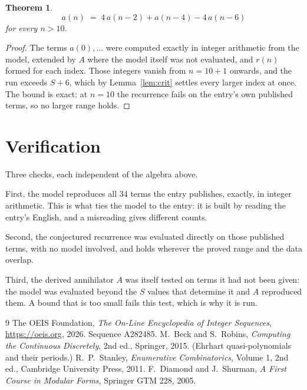 \documentclass[11pt,a4paper]{article}
\theoremstyle{plain}
\newtheorem{theorem}{Theorem}
\theoremstyle{definition}
\begin{document}
\begin{theorem}
\[
a(n)\;=\;4\,a(n-2) + a(n-4) - 4\,a(n-6)
\]
for every $n>10$.
\end{theorem}

\begin{proof}
The terms $a(0),\dots$ were computed exactly in integer arithmetic from the model, extended by
$A$ where the model itself was not evaluated, and $r(n)$ formed for each index. Those integers
vanish from $n=10+1$ onwards, and the run exceeds $S+6$, which by
Lemma~\ref{lem:crit} settles every larger index at once. The bound is exact: at $n=10$ the recurrence fails on the entry's own published terms, so no larger range holds.
\end{proof}

\section{Verification}

Three checks, each independent of the algebra above.

First, the model reproduces all $34$ terms the entry publishes, exactly, in integer
arithmetic. This is what ties the model to the entry: it is built by reading the entry's
English, and a misreading gives different counts.

Second, the conjectured recurrence was evaluated directly on those published terms, with no
model involved, and holds wherever the proved range and the data overlap.

Third, the derived annihilator $A$ was itself tested on terms it had not been given: the model
was evaluated beyond the $S$ values that determine it and $A$ reproduced them. A bound that is
too small fails this test, which is why it is run.

\begin{thebibliography}{9}
 The OEIS Foundation, \emph{The On-Line Encyclopedia of Integer
Sequences}, \url{https://oeis.org}, 2026. Sequence A282485.
 M.~Beck and S.~Robins, \emph{Computing the Continuous Discretely},
2nd ed., Springer, 2015. (Ehrhart quasi-polynomials and their periods.)
 R.~P.~Stanley, \emph{Enumerative Combinatorics}, Volume 1, 2nd ed.,
Cambridge University Press, 2011.
 F.~Diamond and J.~Shurman, \emph{A First Course in Modular Forms},
Springer GTM 228, 2005.
\end{thebibliography}
\end{document}
